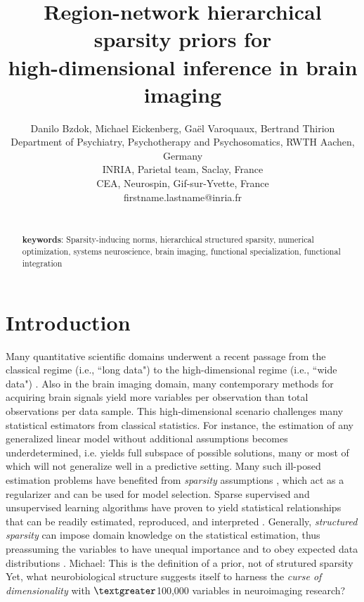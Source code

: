 \documentclass{article} %
\title{Region-network hierarchical sparsity priors for\\
high-dimensional inference in brain imaging}
\begin{document}
\author{Danilo Bzdok, Michael Eickenberg,
  Ga\"el Varoquaux, Bertrand Thirion\\
  Department of Psychiatry, Psychotherapy and Psychosomatics, RWTH Aachen, Germany\\
  INRIA, Parietal team, Saclay, France\\
  CEA, Neurospin, Gif-sur-Yvette, France\\
  firstname.lastname@inria.fr}

\maketitle

\begin{abstract}


\textbf{\\keywords}:
Sparsity-inducing norms, hierarchical structured sparsity,
numerical optimization,
systems neuroscience, brain imaging,
functional specialization, functional integration

\end{abstract}



\section{Introduction}
Many quantitative scientific domains underwent a
recent passage from the classical regime (i.e., ``long data")  to
the high-dimensional regime (i.e., ``wide data")
\cite{jordan2015massive}.
Also in the brain imaging domain,
many contemporary methods for acquiring brain signals yield
more variables per observation than
total observations per data sample.
This high-dimensional scenario challenges many statistical estimators from
classical statistics.
For instance,
the estimation of any generalized linear model without additional assumptions
becomes underdetermined, i.e. yields full subspace of possible solutions, many or most of which will not generalize well in a predictive setting.
%
Many such ill-posed estimation problems
have benefited from
\textit{sparsity} assumptions
\cite{buhlmann2011statistics, hastie2015statistical}, which act as a 
regularizer and can be used for model selection.
Sparse supervised and unsupervised
learning algorithms have proven to yield
statistical relationships that can be readily
estimated, reproduced, and interpreted
\cite{giraud2014introduction}.
%
Generally, \textit{structured sparsity} can impose
domain knowledge on the 
statistical estimation,
thus preassuming the variables to have unequal importance
and to obey expected data distributions
\cite{bach2012optimization}.
{\color{red}Michael: This is the definition of a prior, not of strutured sparsity}
Yet, what neurobiological structure suggests itself
to harness the
\textit{curse of dimensionality} with
$\textgreater$100,000 variables
in neuroimaging research?
\end{document}
